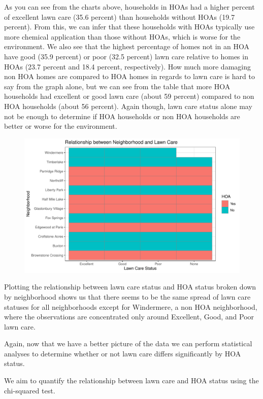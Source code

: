 \documentclass{article}
\begin{document}
As you can see from the charts above, households in HOAs had a higher percent of excellent lawn care (35.6 percent) than households without HOAs (19.7 percent). From this, we can infer that these households with HOAs typically use more chemical application than those without HOAs, which is worse for the environment. We also see that the highest percentage of homes not in an HOA have good (35.9 percent) or poor (32.5 percent) lawn care relative to homes in HOAs (23.7 percent and 18.4 percent, respectively). How much more damaging non HOA homes are compared to HOA homes in regards to lawn care is hard to say from the graph alone, but we can see from the table that more HOA households had excellent or good lawn care (about 59 percent) compared to non HOA households (about 56 percent). Again though, lawn care status alone may not be enough to determine if HOA households or non HOA households are better or worse for the environment. 
\begin{figure}[H]
		\centering
\includegraphics{exam23-016}
		\label{Fig:plot5}
	\end{figure}
Plotting the relationship between lawn care status and HOA status broken down by neighborhood shows us that there seems to be the same spread of lawn care statuses for all neighborhoods except for Windermere, a non HOA neighborhood, where the observations are concentrated only around Excellent, Good, and Poor lawn care. 

Again, now that we have a better picture of the data we can perform statistical analyses to determine whether or not lawn care differs significantly by HOA status. 

We aim to quantify the relationship between lawn care and HOA status using the chi-squared test.
\end{document}
